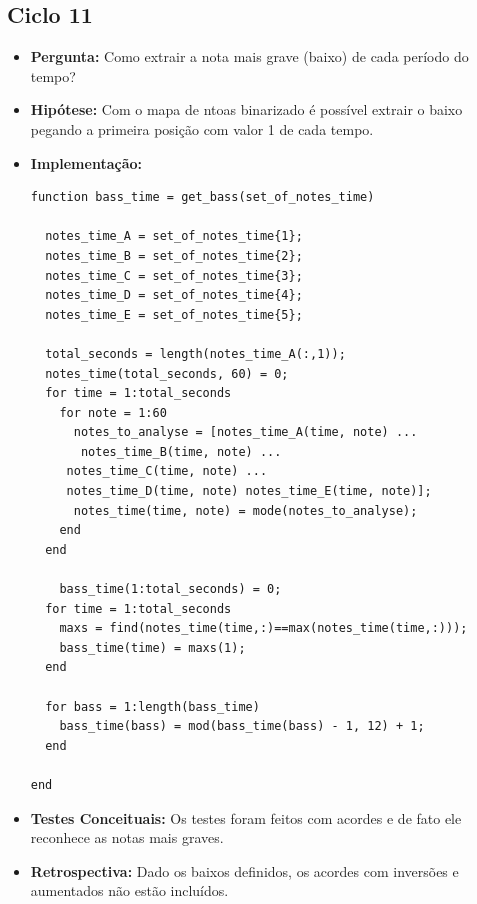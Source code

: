 \subsection{Ciclo 11}
\begin{itemize}
\item \textbf{Pergunta:} Como extrair a nota mais grave (baixo) de cada período do tempo?
\item \textbf{Hipótese:} Com o mapa de ntoas binarizado é possível extrair o baixo pegando a primeira posição com valor 1 de cada tempo.
\item \textbf{Implementação:}
\begin{lstlisting}
function bass_time = get_bass(set_of_notes_time)

  notes_time_A = set_of_notes_time{1};
  notes_time_B = set_of_notes_time{2};
  notes_time_C = set_of_notes_time{3};
  notes_time_D = set_of_notes_time{4};
  notes_time_E = set_of_notes_time{5};

  total_seconds = length(notes_time_A(:,1));
  notes_time(total_seconds, 60) = 0;
  for time = 1:total_seconds
    for note = 1:60
      notes_to_analyse = [notes_time_A(time, note) ...
       notes_time_B(time, note) ...
     notes_time_C(time, note) ...
     notes_time_D(time, note) notes_time_E(time, note)];
      notes_time(time, note) = mode(notes_to_analyse);
    end
  end

    bass_time(1:total_seconds) = 0;
  for time = 1:total_seconds
    maxs = find(notes_time(time,:)==max(notes_time(time,:)));
    bass_time(time) = maxs(1);
  end

  for bass = 1:length(bass_time)
    bass_time(bass) = mod(bass_time(bass) - 1, 12) + 1;
  end

end
\end{lstlisting}
\item \textbf{Testes Conceituais:} Os testes foram feitos com acordes e de fato ele reconhece as notas mais graves.
\item \textbf{Retrospectiva:} Dado os baixos definidos, os acordes com inversões e aumentados não estão incluídos.
\end{itemize}


